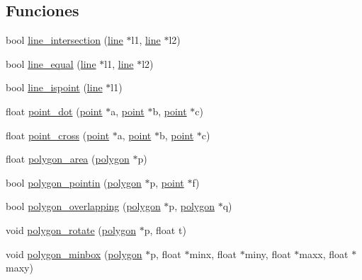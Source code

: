 \subsection*{Funciones}
\begin{CompactItemize}
\item 
bool \hyperlink{group__geometry_g95f804c79e71c1ca62453b6f0123e307_g95f804c79e71c1ca62453b6f0123e307}{line\_\-intersection} (\hyperlink{struct__line}{line} $\ast$l1, \hyperlink{struct__line}{line} $\ast$l2)
\item 
bool \hyperlink{group__geometry_ga27fbafb04a36a60af7bd5cafbdfd412_ga27fbafb04a36a60af7bd5cafbdfd412}{line\_\-equal} (\hyperlink{struct__line}{line} $\ast$l1, \hyperlink{struct__line}{line} $\ast$l2)
\item 
bool \hyperlink{group__geometry_g68d4dad9b8e742b0d63affc853f80391_g68d4dad9b8e742b0d63affc853f80391}{line\_\-ispoint} (\hyperlink{struct__line}{line} $\ast$l1)
\item 
float \hyperlink{group__geometry_ga7ae8d919209fea43e8a61215398bbbe_ga7ae8d919209fea43e8a61215398bbbe}{point\_\-dot} (\hyperlink{struct__point}{point} $\ast$a, \hyperlink{struct__point}{point} $\ast$b, \hyperlink{struct__point}{point} $\ast$c)
\item 
float \hyperlink{group__geometry_gb97527165a510655ee37cd3ccfa8d932_gb97527165a510655ee37cd3ccfa8d932}{point\_\-cross} (\hyperlink{struct__point}{point} $\ast$a, \hyperlink{struct__point}{point} $\ast$b, \hyperlink{struct__point}{point} $\ast$c)
\item 
float \hyperlink{group__geometry_gcfbc9e7772d80361768bc0b65cebbca1_gcfbc9e7772d80361768bc0b65cebbca1}{polygon\_\-area} (\hyperlink{struct__polygon}{polygon} $\ast$p)
\item 
bool \hyperlink{group__geometry_geab0a1d6da7c44ae49494958bb885504_geab0a1d6da7c44ae49494958bb885504}{polygon\_\-pointin} (\hyperlink{struct__polygon}{polygon} $\ast$p, \hyperlink{struct__point}{point} $\ast$f)
\item 
bool \hyperlink{group__geometry_g2be6101a257ea8896e61e93d14b22b89_g2be6101a257ea8896e61e93d14b22b89}{polygon\_\-overlapping} (\hyperlink{struct__polygon}{polygon} $\ast$p, \hyperlink{struct__polygon}{polygon} $\ast$q)
\item 
void \hyperlink{group__geometry_g95276abee7240f116afaf80a3e1f23c4_g95276abee7240f116afaf80a3e1f23c4}{polygon\_\-rotate} (\hyperlink{struct__polygon}{polygon} $\ast$p, float t)
\item 
void \hyperlink{group__geometry_g137ef6f552a0a04c5ae0493690088f3f_g137ef6f552a0a04c5ae0493690088f3f}{polygon\_\-minbox} (\hyperlink{struct__polygon}{polygon} $\ast$p, float $\ast$minx, float $\ast$miny, float $\ast$maxx, float $\ast$maxy)

\end{CompactItemize}
